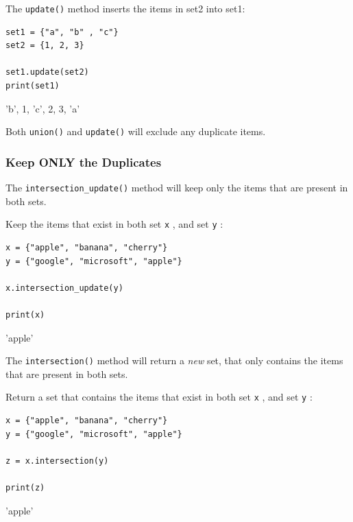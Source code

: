 \documentclass[12pt,a4paper]{article}
\newcommand{\code}[1]{%
	\colorbox{backcolour}{\lstinline{#1}}%
}
\newcommand{\lcode}[1]{%
	\lstinline{#1}%
}
\begin{document}
\begin{ebox}
The \lcode{update()} method inserts the items in set2 into set1:
	\begin{lstlisting}
set1 = {"a", "b" , "c"}
set2 = {1, 2, 3}

set1.update(set2)
print(set1)
	\end{lstlisting}
\tcblower
	\begin{vercode}
{'b', 1, 'c', 2, 3, 'a'}
	\end{vercode}
\end{ebox}

\begin{nbox}
	Both \code{union()} and \code{update()} will exclude any duplicate items.
\end{nbox}
\vfill\newpage
\subsubsection{Keep ONLY the Duplicates}

The \code{intersection_update()} method will keep only the items that are present in both sets.

\begin{ebox}
Keep the items that exist in both set \lcode{x}, and set \lcode{y}:
	\begin{lstlisting}
x = {"apple", "banana", "cherry"}
y = {"google", "microsoft", "apple"}

x.intersection_update(y)

print(x)
	\end{lstlisting}
\tcblower
	\begin{vercode}
{'apple'}
	\end{vercode}
\end{ebox}

The \code{intersection()} method will return a \textit{new} set, that only
contains the items that are present in both sets.

\begin{ebox}
Return a set that contains the items that exist in both set \lcode{x}, and set \lcode{y}:
	\begin{lstlisting}
x = {"apple", "banana", "cherry"}
y = {"google", "microsoft", "apple"}

z = x.intersection(y)

print(z)
	\end{lstlisting}
\tcblower
	\begin{vercode}
{'apple'}
	\end{vercode}
\end{ebox}
\end{document}
